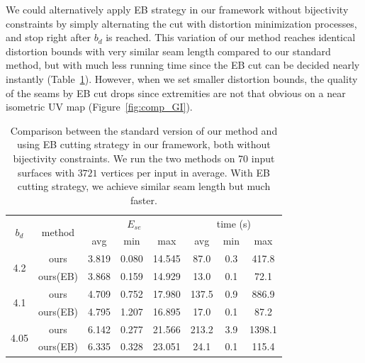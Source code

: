 We could alternatively apply EB strategy in our framework without bijectivity constraints by simply alternating the cut with distortion minimization processes, and stop right after $b_d$ is reached. This variation of our method reaches identical distortion bounds with very similar seam length compared to our standard method, but with much less running time since the EB cut can be decided nearly instantly (Table~\ref{tb:comp_GI}). However, when we set smaller distortion bounds, the quality of the seams by EB cut drops since extremities are not that obvious on a near isometric UV map (Figure~\ref{fig:comp_GI}).

\begin{table}[!h]
\centering
\caption{Comparison between the standard version of our method and using EB cutting strategy in our framework, both without bijectivity constraints. We run the two methods on 70 input surfaces with $3721$ vertices per input in average. With EB cutting strategy, we achieve similar seam length but much faster.} 
\label{tb:comp_GI}
\begin{tabular}{|c|c|ccc|ccc|}
\hline
\multirow{2}{*}{$b_d$} & \multirow{2}{*}{method} & \multicolumn{3}{c|}{$E_{se}$} & \multicolumn{3}{c|}{time (s)} \\ \cline{3-8} 
                       &                         & avg      & min     & max      & avg       & min    & max      \\ \hline
\multirow{2}{*}{4.2}   & ours                    & 3.819   & 0.080  & 14.545  & 87.0   & 0.3 & 417.8 \\
                       & ours(EB)                & 3.868   & 0.159  & 14.929  & 13.0   & 0.1 & 72.1  \\ \hline
\multirow{2}{*}{4.1}   & ours                    & 4.709   & 0.752  & 17.980  & 137.5  & 0.9 & 886.9 \\
                       & ours(EB)                & 4.795   & 1.207  & 16.895  & 17.0   & 0.1 & 87.2  \\ \hline
\multirow{2}{*}{4.05}  & ours                    & 6.142   & 0.277  & 21.566  & 213.2  & 3.9 & 1398.1   \\
                       & ours(EB)                & 6.335   & 0.328  & 23.051  & 24.1   & 0.1 & 115.4 \\ \hline
\end{tabular}
\end{table}

